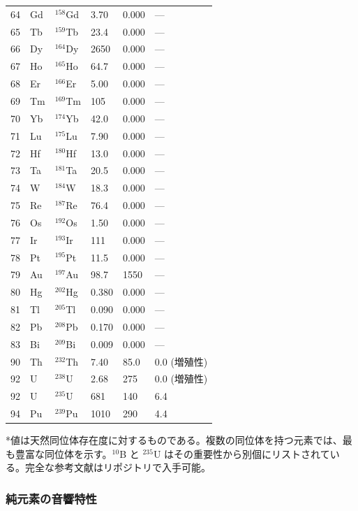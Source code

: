 \documentclass[11pt,a4paper]{article}
\theoremstyle{remark}
\begin{document}
\begin{longtable}{p{0.8cm}p{1.2cm}p{2.0cm}p{2.5cm}p{2.5cm}p{2.5cm}}
		64 & Gd & \(^{158}\)Gd & 3.70 & 0.000 & --- \\
		65 & Tb & \(^{159}\)Tb & 23.4 & 0.000 & --- \\
		66 & Dy & \(^{164}\)Dy & 2650 & 0.000 & --- \\
		67 & Ho & \(^{165}\)Ho & 64.7 & 0.000 & --- \\
		68 & Er & \(^{166}\)Er & 5.00 & 0.000 & --- \\
		69 & Tm & \(^{169}\)Tm & 105 & 0.000 & --- \\
		70 & Yb & \(^{174}\)Yb & 42.0 & 0.000 & --- \\
		71 & Lu & \(^{175}\)Lu & 7.90 & 0.000 & --- \\
		72 & Hf & \(^{180}\)Hf & 13.0 & 0.000 & --- \\
		73 & Ta & \(^{181}\)Ta & 20.5 & 0.000 & --- \\
		74 & W  & \(^{184}\)W & 18.3 & 0.000 & --- \\
		75 & Re & \(^{187}\)Re & 76.4 & 0.000 & --- \\
		76 & Os & \(^{192}\)Os & 1.50 & 0.000 & --- \\
		77 & Ir & \(^{193}\)Ir & 111 & 0.000 & --- \\
		78 & Pt & \(^{195}\)Pt & 11.5 & 0.000 & --- \\
		79 & Au & \(^{197}\)Au & 98.7 & 1550 & --- \\
		80 & Hg & \(^{202}\)Hg & 0.380 & 0.000 & --- \\
		81 & Tl & \(^{205}\)Tl & 0.090 & 0.000 & --- \\
		82 & Pb & \(^{208}\)Pb & 0.170 & 0.000 & --- \\
		83 & Bi & \(^{209}\)Bi & 0.009 & 0.000 & --- \\
		90 & Th & \(^{232}\)Th & 7.40 & 85.0 & 0.0 (増殖性) \\
		92 & U  & \(^{238}\)U & 2.68 & 275 & 0.0 (増殖性) \\
		92 & U  & \(^{235}\)U & 681 & 140 & 6.4 \\
		94 & Pu & \(^{239}\)Pu & 1010 & 290 & 4.4 \\
		\bottomrule
	\end{longtable}
	*値は天然同位体存在度に対するものである。複数の同位体を持つ元素では、最も豊富な同位体を示す。\(^{10}\)B と \(^{235}\)U はその重要性から別個にリストされている。完全な参考文献はリポジトリで入手可能。
	
	\subsubsection{純元素の音響特性}
	\label{subsec:acoustic-properties-func}
	
\end{document}
